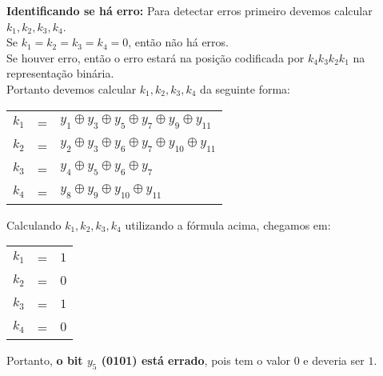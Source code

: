 \documentclass[12pt]{article}
\begin{document}
\begin{itemize}
			\subitem\textbf{Identificando se há erro:}
					\hfill\newline
					Para detectar erros primeiro devemos calcular $k_1, k_2, k_3, k_4$.\\
					Se $k_1 = k_2 = k_3 = k_4 = 0$, então não há erros.\\
					Se houver erro, então o erro estará na posição codificada  por $k_4k_3k_2k_1$
					na representação binária.\\
					Portanto devemos calcular $k_1, k_2, k_3, k_4$ da seguinte forma:
					\begin{center}
						\begin{tabular}{ccl}
							$k_1$ & = & $y_1 \oplus y_3 \oplus y_5 \oplus y_7 \oplus y_9 \oplus y_{11}$\\
							$k_2$ & = & $y_2 \oplus y_3 \oplus y_6 \oplus y_7 \oplus y_{10} \oplus y_{11}$\\
							$k_3$& = & $y_4 \oplus y_5 \oplus y_6 \oplus y_7$\\
							$k_4$ & = & $y_8 \oplus y_9 \oplus y_{10} \oplus y_{11}$\\
						\end{tabular}
					\end{center}
					Calculando $k_1, k_2, k_3, k_4$ utilizando a fórmula acima, chegamos em:\\
					\begin{center}
						\begin{tabular}{ccl}
							$k_1$ & = & $1$\\
							$k_2$ & = & $0$\\
							$k_3$& = & $1$\\
							$k_4$ & = & $0$\\
						\end{tabular}
					\end{center}
					Portanto, \textbf{o bit $y_5$ (0101) está errado}, pois tem o valor $0$ e 
					deveria ser $1$.
	\end{itemize}
\end{document}
